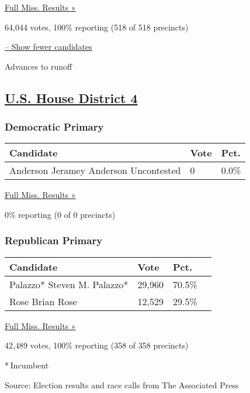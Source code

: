 \href{https://www.nytimes3xbfgragh.onion/elections/results/mississippi}{Full
Miss. Results »}

64,044 votes, 100\% reporting (518 of 518 precincts)

\protect\hyperlink{}{-- Show fewer candidates}

 Advances to runoff

\hypertarget{us-house-district-4}{%
\subsection{\texorpdfstring{\href{https://www.nytimes3xbfgragh.onion/elections/results/mississippi-house-district-4-primary-election}{U.S.
House District 4}}{U.S. House District 4}}\label{us-house-district-4}}

\hypertarget{democratic-primary-4}{%
\subsubsection{Democratic Primary}\label{democratic-primary-4}}

\begin{longtable}[]{@{}lll@{}}
\toprule
Candidate & Vote & Pct.\tabularnewline
\midrule
\endhead
 Anderson Jeramey Anderson Uncontested & 0 & 0.0\%\tabularnewline
\bottomrule
\end{longtable}

\href{https://www.nytimes3xbfgragh.onion/elections/results/mississippi}{Full
Miss. Results »}

0\% reporting (0 of 0 precincts)

\hypertarget{republican-primary-3}{%
\subsubsection{Republican Primary}\label{republican-primary-3}}

\begin{longtable}[]{@{}llll@{}}
\toprule
Candidate & Vote & Pct. &\tabularnewline
\midrule
\endhead
 Palazzo* Steven M. Palazzo* & 29,960 & 70.5\% &\tabularnewline
 Rose Brian Rose & 12,529 & 29.5\% &\tabularnewline
\bottomrule
\end{longtable}

\href{https://www.nytimes3xbfgragh.onion/elections/results/mississippi}{Full
Miss. Results »}

42,489 votes, 100\% reporting (358 of 358 precincts)

* Incumbent

Source: Election results and race calls from The Associated Press


